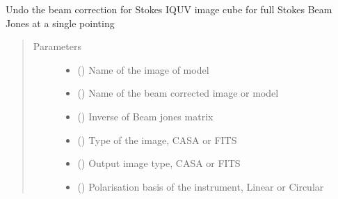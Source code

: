 \documentclass[letterpaper,10pt,english]{sphinxmanual}
\begin{document}
\begin{fulllineitems}
\begin{fulllineitems}
\label{\detokenize{paircars:paircars.fullpol_selfcal_LTS.PolSelfcal.uncorrect_for_single_beam_jones}}
\sphinxAtStartPar
Undo the beam correction for Stokes IQUV image cube for full Stokes Beam Jones at a single pointing
\begin{quote}\begin{description}
\item[{Parameters}] \leavevmode\begin{itemize}
\item {} 
\sphinxAtStartPar
{} () \textendash{} Name of the image of model

\item {} 
\sphinxAtStartPar
{} () \textendash{} Name of the beam corrected image or model

\item {} 
\sphinxAtStartPar
{} () \textendash{} Inverse of Beam jones matrix

\item {} 
\sphinxAtStartPar
{} () \textendash{} Type of the image, CASA or FITS

\item {} 
\sphinxAtStartPar
{} () \textendash{} Output image type, CASA or FITS

\item {} 
\sphinxAtStartPar
{} () \textendash{} Polarisation basis of the instrument, Linear or Circular


\end{itemize}
\end{description}
\end{quote}
\end{fulllineitems}
\end{fulllineitems}
\end{document}
